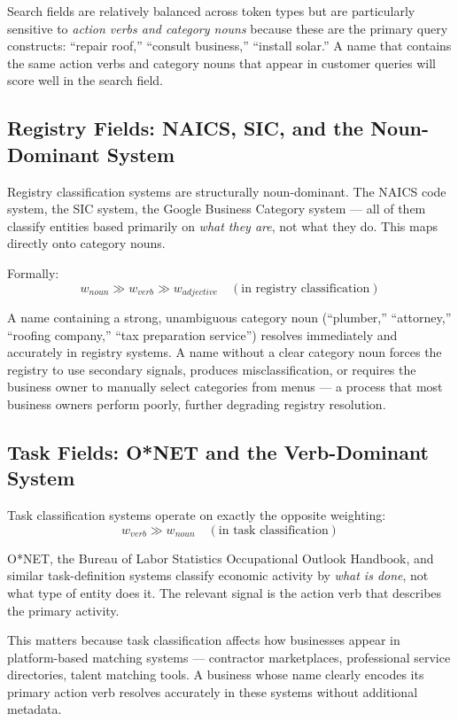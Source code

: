 \documentclass[12pt, openany]{book}
\theoremstyle{thmstyle}
\theoremstyle{defstyle}
\begin{document}
Search fields are relatively balanced across token types but are particularly sensitive to \textit{action verbs and category nouns} because these are the primary query constructs: ``repair roof,'' ``consult business,'' ``install solar.'' A name that contains the same action verbs and category nouns that appear in customer queries will score well in the search field.

\subsection{Registry Fields: NAICS, SIC, and the Noun-Dominant System}

Registry classification systems are structurally noun-dominant. The NAICS code system, the SIC system, the Google Business Category system --- all of them classify entities based primarily on \textit{what they are}, not what they do. This maps directly onto category nouns.

Formally:
\[
w_{noun} \gg w_{verb} \gg w_{adjective} \quad (\text{in registry classification})
\]

A name containing a strong, unambiguous category noun (``plumber,'' ``attorney,'' ``roofing company,'' ``tax preparation service'') resolves immediately and accurately in registry systems. A name without a clear category noun forces the registry to use secondary signals, produces misclassification, or requires the business owner to manually select categories from menus --- a process that most business owners perform poorly, further degrading registry resolution.

\subsection{Task Fields: O*NET and the Verb-Dominant System}

Task classification systems operate on exactly the opposite weighting:
\[
w_{verb} \gg w_{noun} \quad (\text{in task classification})
\]

O*NET, the Bureau of Labor Statistics Occupational Outlook Handbook, and similar task-definition systems classify economic activity by \textit{what is done}, not what type of entity does it. The relevant signal is the action verb that describes the primary activity.

This matters because task classification affects how businesses appear in platform-based matching systems --- contractor marketplaces, professional service directories, talent matching tools. A business whose name clearly encodes its primary action verb resolves accurately in these systems without additional metadata.
\end{document}
